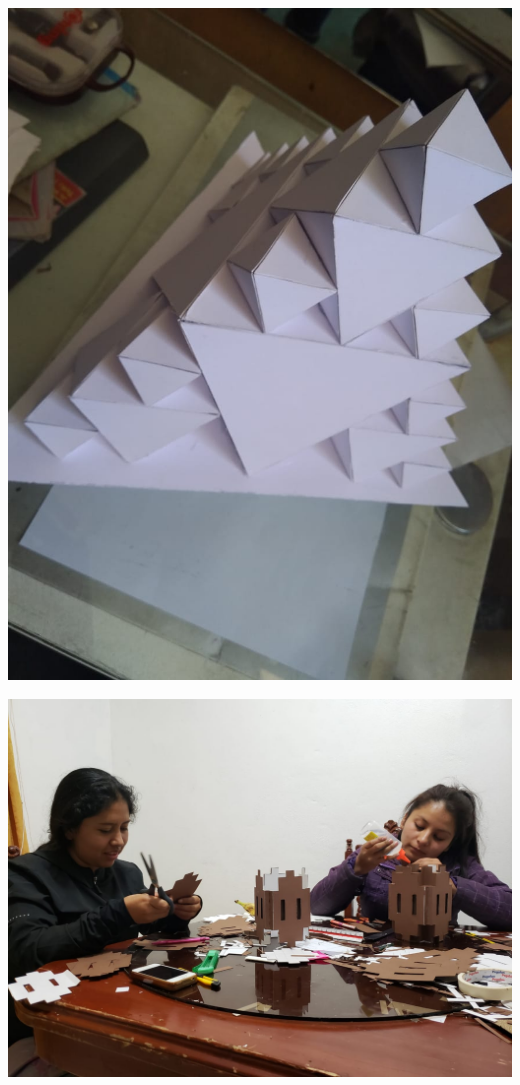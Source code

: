\documentclass[12pt,]{report}
\begin{document}
\includegraphics{r2.jpeg}

\includegraphics{r3.jpeg}
\end{document}
